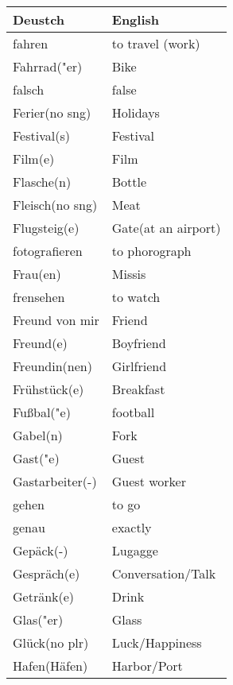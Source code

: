 \documentclass{article}
\renewcommand{\arraystretch}{1}
\begin{document}
\hfill
\begin{minipage}{0.48\textwidth}
    \centering
    \renewcommand{\arraystretch}{1.5}
    \begin{tabular}{|>{\raggedright\arraybackslash}p{3.5cm}|>{\raggedright\arraybackslash}p{3.5cm}|}
        \hline
        \rowcolor{gray!20} \textbf{Deustch} & \textbf{English} \\
        \hline
        fahren & to travel (work) \\\hline
        Fahrrad("er) & Bike \\\hline
        falsch & false \\\hline
        Ferier(no sng) & Holidays \\\hline
        Festival(s) & Festival \\\hline
        Film(e) & Film \\\hline
        Flasche(n) & Bottle \\\hline
        Fleisch(no sng) & Meat \\\hline
        Flugsteig(e) & Gate(at an airport) \\\hline
        fotografieren & to phorograph \\\hline
        Frau(en) & Missis \\\hline
        frensehen & to watch  \\\hline
        Freund von mir & Friend \\\hline
        Freund(e) & Boyfriend \\\hline
        Freundin(nen) & Girlfriend \\\hline
        Frühstück(e) & Breakfast \\\hline
        Fu\ss{}bal("e) & football \\\hline
        Gabel(n) & Fork \\\hline
        Gast("e) & Guest \\\hline
        Gastarbeiter(-) & Guest worker \\\hline
        gehen & to go \\\hline
        genau & exactly \\\hline
        Gepäck(-) & Lugagge \\\hline
        Gespräch(e) & Conversation/Talk \\\hline
        Getränk(e) & Drink \\\hline
        Glas("er) & Glass \\\hline
        Glück(no plr) & Luck/Happiness \\\hline
        Hafen(Häfen) & Harbor/Port \\\hline

\end{tabular}
\end{minipage}
\end{document}
